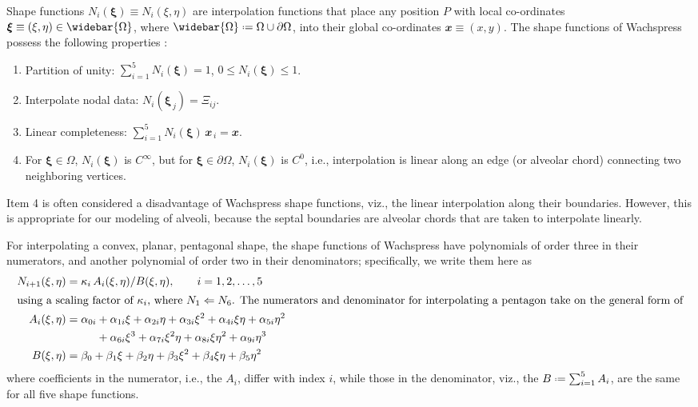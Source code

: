 Shape functions $N_i (\boldsymbol{\xi}) \equiv N_i (\xi, \eta)$ are interpolation functions that place any position $P$ with local co-ordinates $\boldsymbol{\xi} \equiv (\xi, \eta) \in \widebar{\Omega}$, where $\widebar{\Omega} \defeq \Omega \cup \partial\Omega$, into their global co-ordinates $\mathbfit{x} \equiv (x,y)$.  The shape functions of Wachspress \cite{Wachspress75,Wachspress16} possess the following properties \cite{SukumarMalsch06}:
\begin{enumerate}
	\item Partition of unity: $\sum\nolimits_{i=1}^5 N_i (\boldsymbol{\xi}) = 1$, \; $0 \leq N_i (\boldsymbol{\xi}) \leq 1$.
	\item Interpolate nodal data: $N_i (\boldsymbol{\xi}_{\,j}) = \Xi_{ij}$.
	\item Linear completeness: $\sum\nolimits_{i=1}^5 N_i (\boldsymbol{\xi}) \, \mathbfit{x}_{\,i} = \mathbfit{x}$.
	\item For $\boldsymbol{\xi} \in \Omega$, $N_i (\boldsymbol{\xi})$ is $C^{\infty}$, but for $\boldsymbol{\xi} \in \partial \Omega$, $N_i (\boldsymbol{\xi})$ is $C^0$, i.e., interpolation is linear along an edge (or alveolar chord) connecting two neighboring vertices.
\end{enumerate}
Item 4 is often considered a disadvantage of Wachspress shape functions, viz., the linear interpolation along their boundaries.  However, this is appropriate for our modeling of alveoli, because the septal boundaries are alveolar chords that are taken to interpolate linearly.

For interpolating a convex, planar, pentagonal shape, the shape functions of Wachspress have polynomials of order three in their numerators, and another polynomial of order two in their denominators; specifically, we write them here as
\begin{subequations}
	\label{shapeFunctions}
	\begin{align}
	N_{i+1} (\xi, \eta) & = \kappa_i \, A_i (\xi, \eta) / B(\xi, \eta) , 
	\qquad i = 1, 2 , \dots , 5 \\ 
	\intertext{using a scaling factor of $\kappa_i$, where $N_1 \Leftarrow N_6$.  The numerators and denominator for interpolating a pentagon take on the general form of}
	A_i (\xi, \eta) & = \alpha_{0i} + \alpha_{1i} \xi + \alpha_{2i} \eta + 
	\alpha_{3i} \xi^2 + \alpha_{4i} \xi\eta + \alpha_{5i} \eta^2 \notag \\ 
	\mbox{} & \phantom{\mbox{} = \alpha_{0i}} + \alpha_{6i} \xi^3 + 
	\alpha_{7i} \xi^2 \eta + \alpha_{8i} \xi \eta^2 + \alpha_{9i} \eta^3
	\label{shapeFnNum} \\
	B (\xi, \eta) & = \beta_0 + \beta_1 \xi + \beta_2 \eta + \beta_3 \xi^2 + 
	\beta_4 \xi\eta + \beta_5 \eta^2 
	\label{shapeFnDenom}
	\end{align}
\end{subequations}
where coefficients in the numerator, i.e., the $A_i$, differ with index $i$, while those in the denominator, viz., the $B \defeq \sum_{i=1}^5 A_i$, are the same for all five shape functions.  

